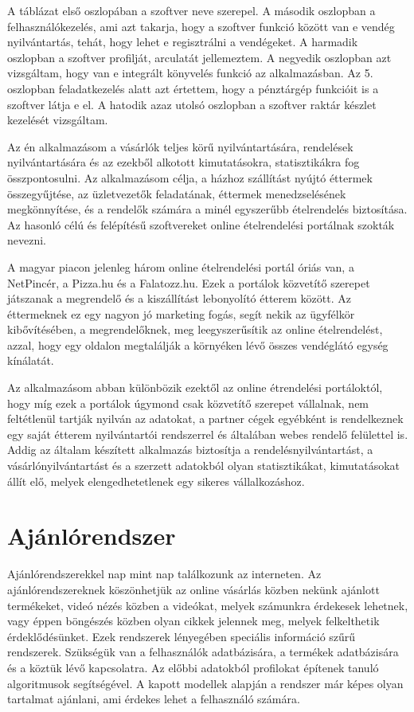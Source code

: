 A táblázat első oszlopában a szoftver neve szerepel. A második oszlopban a felhasználókezelés, ami azt takarja, hogy a szoftver funkció között van e vendég nyilvántartás, tehát, hogy lehet e regisztrálni a vendégeket. A harmadik oszlopban a szoftver profilját, arculatát jellemeztem. A negyedik oszlopban azt vizsgáltam, hogy van e integrált könyvelés funkció az alkalmazásban. Az 5. oszlopban feladatkezelés alatt azt értettem, hogy a pénztárgép funkcióit is a szoftver látja e el. A hatodik azaz utolsó oszlopban a szoftver raktár készlet kezelését vizsgáltam.

Az én alkalmazásom a vásárlók teljes körű nyilvántartására, rendelések nyilvántartására és az ezekből alkotott kimutatásokra, statisztikákra fog összpontosulni. Az alkalmazásom célja, a házhoz szállítást nyújtó éttermek összegyűjtése, az üzletvezetők feladatának, éttermek menedzselésének megkönnyítése, és a rendelők számára a minél egyszerűbb ételrendelés biztosítása. Az hasonló célú és felépítésű szoftvereket online ételrendelési portálnak szokták nevezni.

A magyar piacon jelenleg három online ételrendelési portál óriás van, a NetPincér, a Pizza.hu és a Falatozz.hu. Ezek a portálok közvetítő szerepet játszanak a megrendelő és a kiszállítást lebonyolító étterem között. Az éttermeknek ez egy nagyon jó marketing fogás, segít nekik az ügyfélkör kibővítésében, a megrendelőknek, meg leegyszerűsítik az online ételrendelést, azzal, hogy egy oldalon megtalálják a környéken lévő összes vendéglátó egység kínálatát.

Az alkalmazásom abban különbözik ezektől az online étrendelési portáloktól, hogy míg ezek a portálok úgymond csak közvetítő szerepet vállalnak, nem feltétlenül tartják nyilván az adatokat, a partner cégek egyébként is rendelkeznek egy saját étterem nyilvántartói rendszerrel és általában webes rendelő felülettel is. Addig az általam készített alkalmazás biztosítja a rendelésnyilvántartást, a vásárlónyilvántartást és a szerzett adatokból olyan statisztikákat, kimutatásokat állít elő, melyek elengedhetetlenek egy sikeres vállalkozáshoz.

\section{Ajánlórendszer}

Ajánlórendszerekkel nap mint nap találkozunk az interneten. Az ajánlórendszereknek köszönhetjük az online vásárlás közben nekünk ajánlott termékeket, videó nézés közben a videókat, melyek számunkra érdekesek lehetnek, vagy éppen böngészés közben olyan cikkek jelennek meg, melyek felkelthetik érdeklődésünket. Ezek rendszerek lényegében speciális információ szűrű rendszerek. Szükségük van a felhasználók adatbázisára, a termékek adatbázisára és a köztük lévő kapcsolatra. Az előbbi adatokból profilokat építenek tanuló algoritmusok segítségével. A kapott modellek alapján a rendszer már képes olyan tartalmat ajánlani, ami érdekes lehet a felhasználó számára.

